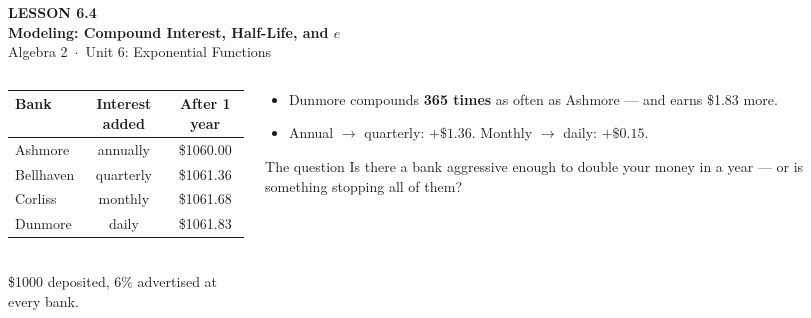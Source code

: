 \documentclass[aspectratio=169, 11pt]{beamer}
\begin{document}
{
\begin{frame}[plain]
  \vspace{2.8cm}\hspace{0.55cm}%
  \begin{minipage}{0.9\textwidth}
    {\color{goldacc}\bfseries\small LESSON 6.4}\\[0.5cm]
    {\color{white}\bfseries\LARGE Modeling: Compound Interest, Half-Life, and $e$}\\[1.2cm]
    {\color{forestmid}\small Algebra 2~$\cdot$~Unit 6: Exponential Functions}
  \end{minipage}
\end{frame}
}

\begin{frame}[t, plain]
  \begin{columns}[T]
    \begin{column}{0.52\textwidth}
      \footnotesize
      \renewcommand{\arraystretch}{1.35}
      \begin{tabular}{|l|c|c|}
      \hline
      \textbf{Bank} & \textbf{Interest added} & \textbf{After 1 year} \\
      \hline
      Ashmore   & annually  & \$1060.00 \\
      Bellhaven & quarterly & \$1061.36 \\
      Corliss   & monthly   & \$1061.68 \\
      Dunmore   & daily     & \$1061.83 \\
      \hline
      \end{tabular}
      \\[6pt]
      {\scriptsize \$1000 deposited, $6\%$ advertised at every bank.}
    \end{column}
    \begin{column}{0.44\textwidth}
      \footnotesize
      \begin{itemize}\setlength{\itemsep}{4pt}
        \item Dunmore compounds \textbf{365 times} as often as Ashmore --- and earns \$1.83 more.
        \item Annual $\to$ quarterly: $+\$1.36$. Monthly $\to$ daily: $+\$0.15$.
      \end{itemize}
      \vspace{3pt}
      \begin{block}{The question}
        Is there a bank aggressive enough to double your money in a year --- or is something stopping
        all of them?
      \end{block}
    \end{column}
  \end{columns}
\end{frame}
\end{document}
